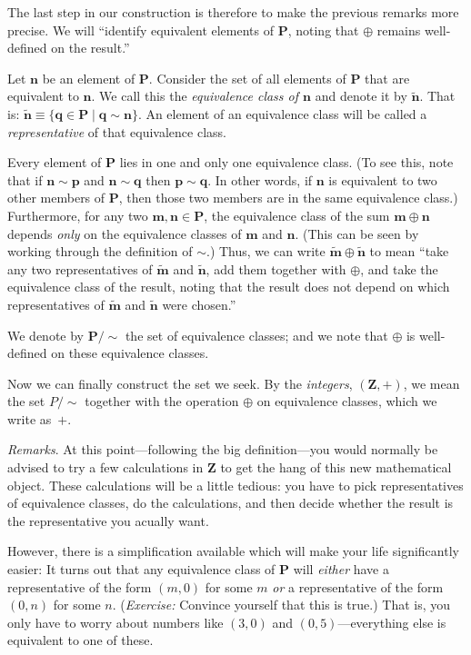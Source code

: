 \documentclass[10pt, a4paper, twocolumn]{article}
\newcommand{\set}[1]{\mathbold{#1}}
\newcommand{\pairs}{\set{P}}
\begin{document}
The last step in our construction is therefore to make the previous
remarks more precise. We will ``identify equivalent elements of
$\pairs$, noting that $\oplus$ remains well-defined on the result.'' 

Let $\mathbold{n}$ be an element of $\pairs$. Consider the set of all
elements of $\pairs$ that are equivalent to $\mathbold{n}$. We call
this the \emph{equivalence class of $\mathbold{n}$} and denote it by
$\tilde{\mathbold{n}}$. That is: $\tilde{\mathbold{n}} \equiv \{
\mathbold{q}\in\pairs \mid \mathbold{q}\sim\mathbold{n}\}$. An element of an
equivalence class will be called a \emph{representative} of that
equivalence class.

Every element of $\pairs$ lies in one and only one equivalence
class. (To see this, note that if $\mathbold{n}\sim\mathbold{p}$ and
$\mathbold{n}\sim\mathbold{q}$ then $\mathbold{p}\sim\mathbold{q}$. In other
words, if $\mathbold{n}$ is equivalent to two other members of
$\pairs$, then those two members are in the same equivalence class.)
Furthermore, for any two $\mathbold{m},\mathbold{n}\in\pairs$, the
equivalence class of the sum $\mathbold{m}\oplus\mathbold{n}$ depends
\emph{only} on the equivalence classes of $\mathbold{m}$ and
$\mathbold{n}$. (This can be seen by working through the definition of
$\sim$.) Thus, we can write $\tilde{\mathbold{m}}\oplus\tilde{\mathbold{n}}$
to mean ``take any two representatives of $\tilde{\mathbold{m}}$ and
$\tilde{\mathbold{n}}$, add them together with $\oplus$, and take the
equivalence class of the result, noting that the result does not
depend on which representatives of $\tilde{\mathbold{m}}$ and
$\tilde{\mathbold{n}}$ were chosen.''

We denote by $\pairs/{\sim}$ the set of equivalence classes; and we note
that $\oplus$ is well-defined on these equivalence classes.

Now we can finally construct the set we seek. By the \emph{integers},
$(\set{Z}, +)$, we mean the set $P/{\sim}$ together with the operation
$\oplus$ on equivalence classes, which we write as~$+$.

\emph{Remarks}. At this point---following the big definition---you would
normally be advised to try a few calculations in $\set{Z}$ to get the
hang of this new mathematical object. These calculations will be a
little tedious: you have to pick representatives of equivalence
classes, do the calculations, and then decide whether the result is
the representative you acually want.

However, there is a simplification available which will make your life
significantly easier: It turns out that any equivalence class of
$\pairs$ will \emph{either} have a representative of the form $(m, 0)$
for some $m$ \emph{or} a representative of the form $(0, n)$ for some
$n$. (\emph{Exercise:} Convince yourself that this is true.) That is,
you only have to worry about numbers like $(3,0)$ and
$(0,5)$---everything else is equivalent to one of these.
\end{document}
